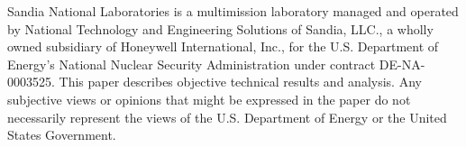 \begin{acknowledgements}
Sandia National Laboratories is a multimission laboratory managed and operated 
by National Technology and Engineering Solutions of Sandia, LLC., a wholly owned
subsidiary of Honeywell International, Inc., for the U.S. Department of 
Energy's 
National Nuclear Security Administration under contract DE-NA-0003525. This paper describes objective technical results and analysis. Any subjective 
views or opinions that might be expressed in the paper do not necessarily 
represent the views of the U.S. Department of Energy or the United States 
Government.
\end{acknowledgements}






